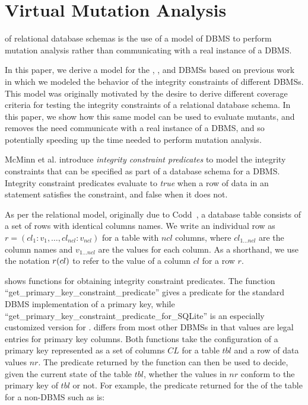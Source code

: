 
\vspace{-1ex}
\section{Virtual Mutation Analysis}
\label{sec:virtual-mutation-analysis}
\VMA of relational database schemas is the use of a model of DBMS to perform mutation analysis rather than communicating with a real instance of a DBMS. 

In this paper, we derive a model for the \HyperSQL, \Postgres, and \SQLite DBMSs based on previous work \cite{McMinn2015} in which we modeled the behavior of the integrity constraints of different DBMSs. This model was originally motivated by the desire to derive different coverage criteria for testing the integrity constraints of a relational database schema. In this paper, we show how this same model can be used to evaluate mutants, and removes the need communicate with a real instance of a DBMS, and so potentially speeding up the time needed to perform mutation analysis.

McMinn et al. introduce {\it integrity constraint predicates} to model the integrity constraints that can be specified as part of a database schema for a DBMS. Integrity constraint predicates evaluate to {\it true} when a row of data in an \INSERT statement satisfies the constraint, and false when it does not.

As per the relational model, originally due to Codd~\cite{Codd1970}, a database table consists of a set of rows with identical columns names. We write an individual row as $r = (cl_1:v_1, \dots, cl_{ncl}:v_{ncl})$ for a table with $ncl$ columns, where $cl_{1 \ldots ncl}$ are the column names and $v_{1 \ldots ncl}$ are the values for each column. As a shorthand, we use the notation $r (cl)$ to refer to the value of a column $cl$ for a row $r$.

\begin{sloppypar}
 shows functions for obtaining integrity constraint predicates. The function
``get\_primary\_key\_constraint\_predicate'' gives a predicate for the standard DBMS implementation of a primary key,
while ``get\_primary\_key\_constraint\_predicate\_for\_SQLite'' is an especially customized version for \SQLite. \SQLite
differs from most other DBMSs in that \NULL values are legal entries for primary key columns. Both functions take the
configuration of a primary key represented as a set of columns $CL$ for a table $tbl$ and a row of data values $nr$. The
predicate returned by the function can then be used to decide, given the current state of the table $tbl$, whether the
values in $nr$ conform to the primary key of $tbl$ or not. For example, the predicate returned for the \PK of the
 table for a non-\SQLite DBMS such as \Postgres is: 
\end{sloppypar}

